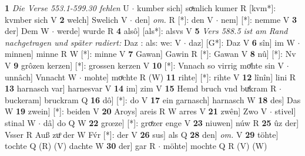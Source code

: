 \documentclass[8pt,a4paper,notitlepage]{article}
\begin{document}
\begin{table}[ht]
\begin{minipage}[t]{0.5\linewidth}
\textbf{1} \textit{Die Verse 553.1-599.30 fehlen} U   $\cdot$ kumber sich] soͯmlich kumer R [kvm*]: kvmber sich V \textbf{2} welch] Swelich V  $\cdot$ den] \textit{om.} R [*]: den V  $\cdot$ nem] [*]: nemme V \textbf{3} der] Dem W  $\cdot$ werde] wurde R \textbf{4} alsô] [als*]: alsvs V \textbf{5} \textit{Vers 588.5 ist am Rand nachgetragen und später radiert:} Daz : als: we: V   $\cdot$ daz] [G*]: Daz V \textbf{6} sîn] im W  $\cdot$ minnen] minne R W [*]: minne V \textbf{7} Gawan] Gawin R [*]: Gawan V \textbf{8} nû] [*]: Nv V \textbf{9} grôzen kerzen] [*]: grossen kerzen V \textbf{10} [*]: Vnnach so virrig moͤhte sin V  $\cdot$ unnâch] Vnnacht W  $\cdot$ mohte] moͯchte R (W) \textbf{11} rihte] [*]: rihte V \textbf{12} lînîn] lini R \textbf{13} harnasch var] harnesvar V \textbf{14} im] zim V \textbf{15} Hemd bruch vnd buͯkram R  $\cdot$ buckeram] bruckram Q \textbf{16} dô] [*]: do V \textbf{17} ein garnasch] harnasch W \textbf{18} des] Das W \textbf{19} zwein] [*]: beiden V \textbf{20} Aroys] areis R W arres V \textbf{21} zwên] Zwo V  $\cdot$ stivel] stinal W  $\cdot$ dâ] do Q W \textbf{22} grœze] [*]: groͤzer enge V \textbf{23} niuwen] núw R \textbf{25} ûz der] Vsser R Auß zuͦ der W Fv́r [*]: der V \textbf{26} sus] als Q \textbf{28} den] \textit{om.} V \textbf{29} töhte] tochte Q (R) (V) dachte W \textbf{30} der] gar R  $\cdot$ möhte] mochte Q R (V) (W) \newline
\end{minipage}
\end{table}
\end{document}

